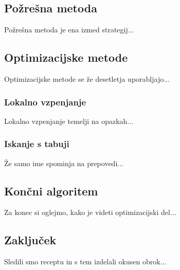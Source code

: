 \documentclass{article}
\begin{document}
\subsection{Požrešna metoda}
Požrešna metoda je ena izmed strategij...

\subsection{Optimizacijske metode}
Optimizacijske metode se že desetletja uporabljajo...

\subsubsection{Lokalno vzpenjanje}
Lokalno vzpenjanje temelji na opazkah...

\subsubsection{Iskanje s tabuji}
Že samo ime spominja na prepovedi...

\subsection{Končni algoritem}
Za konec si oglejmo, kako je videti optimizacijski del...

\subsection{Zaključek}
Sledili smo receptu in s tem izdelali okusen obrok...
\end{document}
